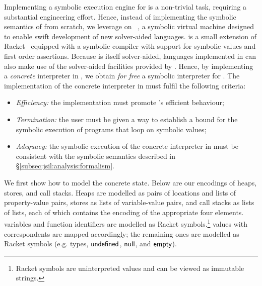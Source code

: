 Implementing a symbolic execution engine for \jsil is a non-trivial 
task, requiring a substantial engineering effort. 
% 
% 
Hence, instead of implementing the symbolic semantics of \jsil from scratch, we leverage on 
\rosette~\cite{Rosette1,Rosette2}, a symbolic virtual machine designed to 
enable swift development of new 
solver-aided languages. 
%
\rosette is a small extension of Racket~\cite{racket} equipped with a symbolic compiler with support 
for symbolic values and first order assertions. Because \rosette is itself solver-aided, languages 
implemented in \rosette can also make use of the solver-aided facilities provided by \rosette. 
Hence, by implementing a \emph{concrete} \jsil interpreter in \rosette, we obtain \emph{for free} a symbolic 
interpreter for \jsil. %
%
The implementation of the concrete interpreter in \rosette must fulfil the following criteria:
\begin{itemize}          
   \item \emph{Efficiency:} the implementation must promote \rosette's efficient behaviour;
   
   \item \emph{Termination:} the user must be given a way to establish a bound for the symbolic execution 
            of programs that loop on symbolic values; 
  
   \item \emph{Adequacy:} the symbolic execution of the concrete interpreter in \rosette 
            must be consistent with the symbolic semantics described in \S\ref{subsec:jsil:analysis:formalism}. 
\end{itemize}


We first show
how to model the concrete \jsil state. Below are our \rosette encodings of \jsil heaps, stores, 
and call stacks. 
Heaps are modelled as pairs of locations and lists of property-value pairs, 
stores as lists of variable-value pairs, and call stacks as lists of lists, each of which
contains the \rosette encoding of the appropriate four elements. 
\jsil variables and function identifiers are modelled 
as Racket symbols.\footnote{Racket symbols are uninterpreted values and can be viewed as immutable strings.} 
\jsil values with \rosette correspondents are mapped accordingly; the remaining 
ones are modelled as Racket symbols (e.g. \jsil types, ${{\sf undefined}}$, ${\sf null}$, and ${\sf empty}$). 

